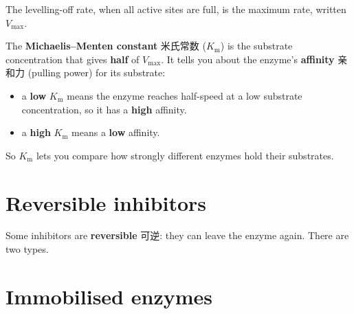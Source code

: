 \documentclass[11pt]{article}
\begin{document}
The levelling-off rate, when all active sites are full, is the maximum rate, written $V_{\text{max}}$.

The \textbf{Michaelis–Menten constant} 米氏常数 ($K_{\text{m}}$) is the substrate concentration that gives \textbf{half} of $V_{\text{max}}$. It tells you about the enzyme's \textbf{affinity} 亲和力 (pulling power) for its substrate:

\begin{itemize}
\item a \textbf{low} $K_{\text{m}}$ means the enzyme reaches half-speed at a low substrate concentration, so it has a \textbf{high} affinity.

\item a \textbf{high} $K_{\text{m}}$ means a \textbf{low} affinity.

\end{itemize}

So $K_{\text{m}}$ lets you compare how strongly different enzymes hold their substrates.

\section*{Reversible inhibitors}

Some inhibitors are \textbf{reversible} 可逆: they can leave the enzyme again. There are two types.

\begin{center}
\end{center}

\section*{Immobilised enzymes}
\end{document}
